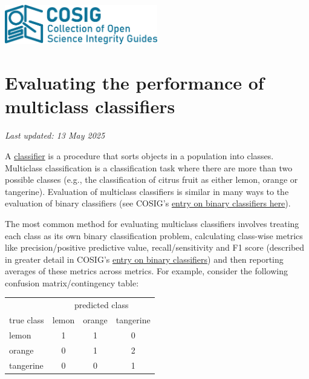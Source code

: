 \documentclass[letterpaper, 12pt]{article}
\begin{document}
\flushleft
\includegraphics[width=0.5\textwidth]{img/home/241017_final_logo_mockup.png}

\section*{Evaluating the performance of multiclass classifiers}
\textit{Last updated: 13 May 2025}

A \href{https://en.wikipedia.org/wiki/Classification_rule}{classifier} is a procedure that sorts objects in a population into classes. Multiclass classification is a classification task where there are more than two possible classes (e.g., the classification of citrus fruit as either lemon, orange or tangerine). Evaluation of multiclass classifiers is similar in many ways to the evaluation of binary classifiers (see COSIG's \href{https://osf.io/pvr4a}{entry on binary classifiers here}).

The most common method for evaluating multiclass classifiers involves treating each class as its own binary classification problem, calculating class-wise metrics like precision/positive predictive value, recall/sensitivity and F1 score (described in greater detail in COSIG's \href{https://osf.io/pvr4a}{entry on binary classifiers}) and then reporting averages of these metrics across metrics. For example, consider the following confusion matrix/contingency table:

\begin{center}
\begin{tabular}{l|ccc}
& \multicolumn{3}{c}{predicted class} \\
true class & lemon & orange & tangerine \\
\hline
lemon & 1 & 1 & 0\\
orange & 0 & 1 & 2\\
tangerine & 0 & 0 & 1\\
\end{tabular}
\end{center}
\end{document}
